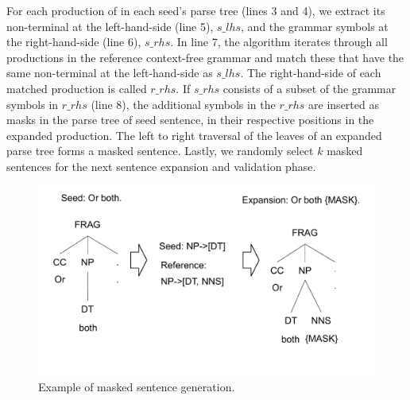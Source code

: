 


For each production of in each seed's parse tree (lines 3 and 4), we
extract its non-terminal at the left-hand-side (line 5), $s\_lhs$, and
the grammar symbols at the right-hand-side (line 6), $s\_rhs$. In line
7, the algorithm iterates through all productions in the reference
context-free grammar and match these that have the same non-terminal
at the left-hand-side as $s\_lhs$.  The right-hand-side of each
matched production is called $r\_rhs$.  If $s\_rhs$ consists of a
subset of the grammar symbols in $r\_rhs$ (line 8), the additional
symbols in the $r\_rhs$ are inserted as masks in the parse tree of
seed sentence, in their respective positions in the expanded
production.  The left to right traversal of the leaves of an expanded
parse tree forms a masked sentence.  Lastly, we randomly select $k$
masked sentences for the next sentence expansion and validation phase.

\begin{figure}
  \centering
  \includegraphics[width=\linewidth]{figs/expansion.pdf}
  \caption{Example of masked sentence generation. }
\label{fig:ExpEx}
\end{figure}

